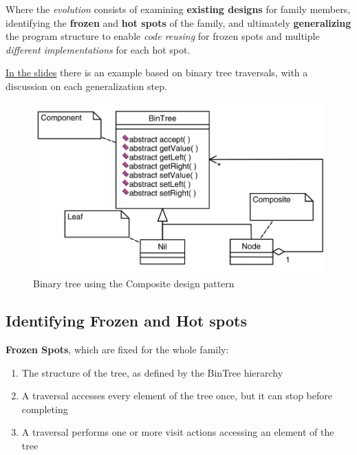 Where the \emph{evolution} consists of examining \textbf{existing designs} for family members, identifying the \textbf{frozen} and \textbf{hot spots} of the family, and ultimately \textbf{generalizing} the program structure to enable \textit{code reusing} for frozen spots and
multiple \textit{different implementations} for each hot spot.

\ul{In the slides} there is an example based on binary tree traversals, with a discussion on each generalization step.

\begin{figure}[htbp]
   \centering
   \includegraphics{images/bintree_composite.png}
   \caption{Binary tree using the Composite design pattern}
   \label{fig:}
\end{figure}

\subsection{Identifying Frozen and Hot spots}
\textbf{Frozen Spots}, which are fixed for the whole family:
\begin{enumerate}
   \item The structure of the tree, as defined by the
   BinTree hierarchy
   \item A traversal accesses every element of the tree
   once, but it can stop before completing
   \item A traversal performs one or more visit actions
   accessing an element of the tree
\end{enumerate}

